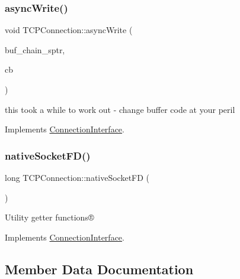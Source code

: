 \subsubsection{\texorpdfstring{async\+Write()}{asyncWrite()}\hspace{0.1cm}{\footnotesize\ttfamily [2/2]}}
{\footnotesize\ttfamily void T\+C\+P\+Connection\+::async\+Write (\begin{DoxyParamCaption}\item[{Buffer\+Chain\+S\+Ptr}]{buf\+\_\+chain\+\_\+sptr,  }\item[{Async\+Write\+Callback}]{cb }\end{DoxyParamCaption})\hspace{0.3cm}{\ttfamily [virtual]}}

this took a while to work out -\/ change buffer code at your peril 

Implements \hyperlink{class_connection_interface}{Connection\+Interface}.

\mbox{\label{class_t_c_p_connection_a76fd32d49d1875e8e4a0f9f503a92bcd}} 
\subsubsection{\texorpdfstring{native\+Socket\+F\+D()}{nativeSocketFD()}}
{\footnotesize\ttfamily long T\+C\+P\+Connection\+::native\+Socket\+FD (\begin{DoxyParamCaption}{ }\end{DoxyParamCaption})\hspace{0.3cm}{\ttfamily [virtual]}}

Utility getter functions® 

Implements \hyperlink{class_connection_interface}{Connection\+Interface}.



\subsection{Member Data Documentation}
\mbox{\label{class_t_c_p_connection_a20685b25079d961a7a9bf1f35b9e80c9}} 
